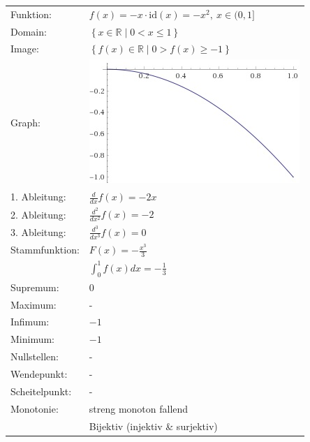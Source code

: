 \documentclass[fleqn,a4paper,12pt]{article}
\newcommand{\R}{{\mathbb R}}
\begin{document}
	\begin{tabular}{l l}
		Funktion:		& $f(x) = -x \cdot \text{id}(x) = -x^2,\ x\in(0,1]$\\
		Domain:			& $\left\lbrace x\in\R\mid 0 < x \le 1\right\rbrace$\\
		Image:			& $\left\lbrace f(x)\in\R\mid 0 > f(x) \ge -1\right\rbrace$\\
		Graph:			& \includegraphics{plot-x2.jpg}\\
		1. Ableitung:	& $\frac{d}{dx}f(x) = -2x$\\
		2. Ableitung:	& $\frac{d^2}{dx^2}f(x) = -2$\\
		3. Ableitung:	& $\frac{d^3}{dx^3}f(x) = 0$\\
		Stammfunktion:	& $F(x) = -\frac{x^3}{3}$\\
						& $\int_0^1 f(x) dx = -\frac{1}{3}$\\
		Supremum:		& $0$\\
		Maximum:		& -\\
		Infimum:		& $-1$\\
		Minimum:		& $-1$\\
		Nullstellen:	& -\\
		Wendepunkt:		& -\\
		Scheitelpunkt:	& -\\
		Monotonie:		& streng monoton fallend\\
						& Bijektiv (injektiv \& surjektiv)\\
						
	\end{tabular}
\end{document}
